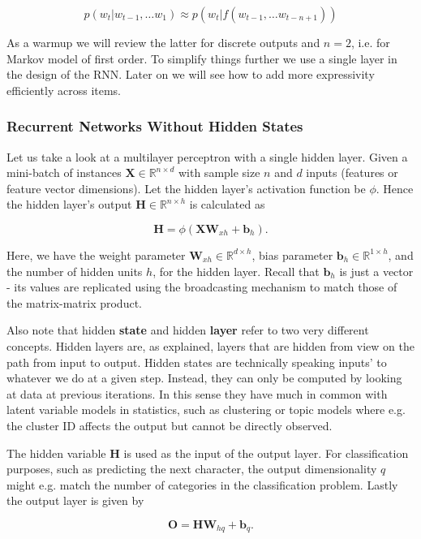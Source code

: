 $$p(w_t|w_{t-1}, \ldots w_1) \approx p(w_t|f(w_{t-1}, \ldots w_{t-n+1}))$$

As a warmup we will review the latter for discrete outputs and $n=2$, i.e. for Markov model of first order. To simplify things further we use a single layer in the design of the RNN. Later on we will see how to add more expressivity efficiently across items.

\subsubsection{Recurrent Networks Without Hidden States}

Let us take a look at a multilayer perceptron with a single hidden layer. Given a mini-batch of instances $\mathbf{X} \in \mathbb{R}^{n \times d}$ with sample size $n$ and $d$ inputs (features or feature vector dimensions). Let the hidden layer's activation function be $\phi$. Hence the hidden layer's output $\mathbf{H} \in \mathbb{R}^{n \times h}$ is calculated as

$$\mathbf{H} = \phi(\mathbf{X} \mathbf{W}_{xh} + \mathbf{b}_h).$$

Here, we have the weight parameter $\mathbf{W}_{xh} \in \mathbb{R}^{d \times
h}$, bias parameter $\mathbf{b}_h \in \mathbb{R}^{1 \times h}$, and the number
of hidden units $h$, for the hidden layer. Recall that $\mathbf{b}_h$ is just a
vector - its values are replicated using the broadcasting mechanism to match those of the matrix-matrix product.

Also note that hidden \textbf{state} and hidden \textbf{layer} refer to two very different concepts. Hidden layers are, as explained, layers that are hidden from view on the path from input to output. Hidden states are technically speaking inputs' to whatever we do at a given step. Instead, they can only be computed by looking at data at previous iterations. In this sense they have much in common with latent variable models in statistics, such as clustering or topic models where e.g. the cluster ID affects the output but cannot be directly observed.

The hidden variable $\mathbf{H}$ is used as the input of the output layer. For classification purposes, such as predicting the next character, the output dimensionality $q$ might e.g. match the number of categories in the classification problem. Lastly the output layer is given by

$$\mathbf{O} = \mathbf{H} \mathbf{W}_{hq} + \mathbf{b}_q.$$

